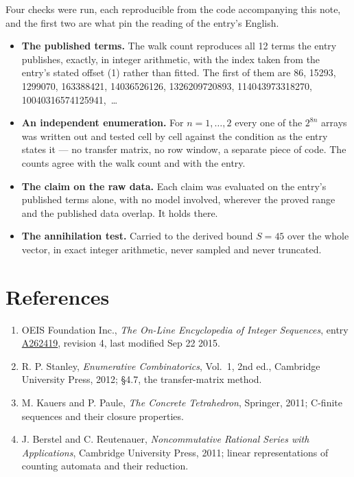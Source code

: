 \documentclass[11pt]{article}
\theoremstyle{definition}
\begin{document}
Four checks were run, each reproducible from the code accompanying this note, and the first two are what pin the reading of the entry's English.

\begin{itemize}

\item {\bfseries The published terms.} The walk count reproduces all 12 terms the entry publishes, exactly, in integer arithmetic, with the index taken from the entry's stated offset (1) rather than fitted. The first of them are 86, 15293, 1299070, 163388421, 14036526126, 1326209720893, 114043973318270, 10040316574125941,~\dots

\item {\bfseries An independent enumeration.} For $n = 1,\dots,2$ every one of the $2^{8n}$ arrays was written out and tested cell by cell against the condition as the entry states it --- no transfer matrix, no row window, a separate piece of code. The counts agree with the walk count and with the entry.

\item {\bfseries The claim on the raw data.} Each claim was evaluated on the entry's published terms alone, with no model involved, wherever the proved range and the published data overlap. It holds there.

\item {\bfseries The annihilation test.} Carried to the derived bound $S = 45$ over the whole vector, in exact integer arithmetic, never sampled and never truncated.

\end{itemize}

\section{References}

\begin{enumerate}

\item OEIS Foundation Inc., \emph{The On-Line Encyclopedia of Integer Sequences}, entry \href{https://oeis.org/A262419}{A262419}, revision 4, last modified Sep 22 2015.

\item R. P. Stanley, \emph{Enumerative Combinatorics}, Vol.~1, 2nd ed., Cambridge University Press, 2012; \S4.7, the transfer-matrix method.

\item M. Kauers and P. Paule, \emph{The Concrete Tetrahedron}, Springer, 2011; C-finite sequences and their closure properties.

\item J. Berstel and C. Reutenauer, \emph{Noncommutative Rational Series with Applications}, Cambridge University Press, 2011; linear representations of counting automata and their reduction.

\end{enumerate}
\end{document}
